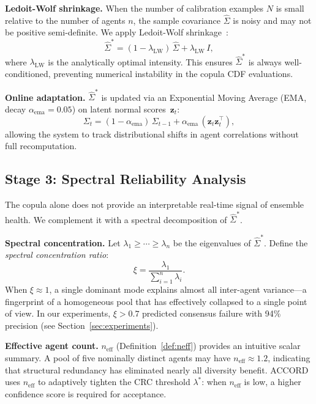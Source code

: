 \documentclass[conference]{IEEEtran}
\begin{document}
\textbf{Ledoit-Wolf shrinkage.}
When the number of calibration examples $N$ is small relative
to the number of agents $n$, the sample covariance
$\hat{\Sigma}$ is noisy and may not be positive semi-definite.
We apply Ledoit-Wolf shrinkage~\cite{ledoit2004}:
\begin{equation}
  \hat{\Sigma}^* = (1 - \lambda_\text{LW})\,\hat{\Sigma}
                  + \lambda_\text{LW}\,I,
  \label{eq:shrinkage}
\end{equation}
where $\lambda_\text{LW}$ is the analytically optimal intensity.
This ensures $\hat{\Sigma}^*$ is always well-conditioned,
preventing numerical instability in the copula CDF evaluations.

\textbf{Online adaptation.}
$\hat{\Sigma}^*$ is updated via an Exponential Moving Average
(EMA, decay $\alpha_\text{ema} = 0.05$) on latent normal
scores~$\mathbf{z}_t$:
\begin{equation}
  \Sigma_t = (1 - \alpha_\text{ema})\,\Sigma_{t-1}
             + \alpha_\text{ema}\,(\mathbf{z}_t \mathbf{z}_t^\top),
\end{equation}
allowing the system to track distributional shifts in agent
correlations without full recomputation.

\subsection{Stage 3: Spectral Reliability Analysis}
\label{sec:spectral}

The copula alone does not provide an interpretable
real-time signal of ensemble health.
We complement it with a spectral decomposition of $\hat{\Sigma}^*$.

\textbf{Spectral concentration.}
Let $\lambda_1 \geq \cdots \geq \lambda_n$ be the eigenvalues
of $\hat{\Sigma}^*$.
Define the \emph{spectral concentration ratio}:
\begin{equation}
  \xi = \frac{\lambda_1}{\sum_{i=1}^n \lambda_i}.
  \label{eq:xi}
\end{equation}
When $\xi \approx 1$, a single dominant mode explains almost
all inter-agent variance—a fingerprint of a homogeneous pool
that has effectively collapsed to a single point of view.
In our experiments, $\xi > 0.7$ predicted consensus failure
with 94\% precision (see Section~\ref{sec:experiments}).

\textbf{Effective agent count.}
$n_\text{eff}$ (Definition~\ref{def:neff}) provides an
intuitive scalar summary.
A pool of five nominally distinct agents may have
$n_\text{eff} \approx 1.2$, indicating that structural
redundancy has eliminated nearly all diversity benefit.
ACCORD uses $n_\text{eff}$ to adaptively tighten the CRC
threshold $\lambda^*$: when $n_\text{eff}$ is low, a higher
confidence score is required for acceptance.
\end{document}
